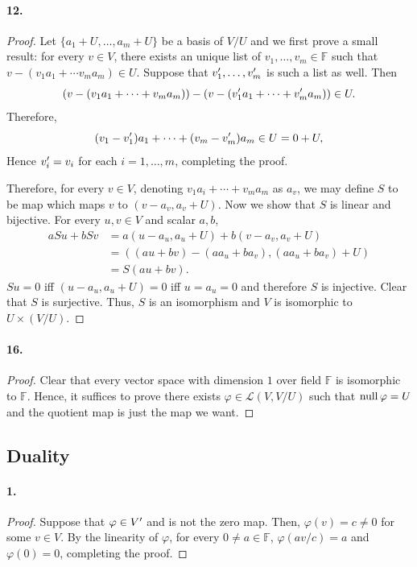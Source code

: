   \paragraph{12.}
  \begin{proof}
    Let $\{a_1+U,\dots, a_m+U\}$ be a basis of $V/U$ and we first prove a small
    result: for every $v\in V$, there exists an unique list of $v_1,\dots,v_m\in
    \mathbb{F}$ such that $v - (v_1a_1 + \cdots v_ma_m)\in U$. Suppose that 
    $v_1^\prime,\dots, v_m^\prime$ is such a list as well. Then 
    \[
      (v - (v_1a_1+\cdots+v_ma_m))-(v - (v_1^\prime a_1+\cdots+v_m^\prime a_m)) \in U.
    \]
    Therefore,
    \[
      (v_1-v_1^\prime)a_1+\cdots+(v_m-v_m^\prime)a_m \in U = 0+U,
    \]
    Hence $v_i^\prime = v_i$ for each $i=1,\dots,m$, completing the proof.\par
    Therefore, for every $v\in V$, denoting $v_1a_i+\cdots+v_ma_m$ as $a_v$, we 
    may define $S$ to be map which maps $v$ to $(v-a_v,a_v+U)$. Now we show that
    $S$ is linear and bijective. For every $u,v\in V$ and scalar $a, b$, 
    \begin{align*}
      aSu + bSv
      &= a(u-a_u,a_u+U) + b(v-a_v,a_v+U)  \\
      &= ((au+bv)-(aa_u+ba_v), (aa_u+ba_v) + U) \\
      &= S(au+bv).
    \end{align*}
    $Su = 0$ iff $(u-a_u,a_u+U) = 0$ iff $u=a_u=0$ and therefore $S$ is 
    injective. Clear that $S$ is surjective. Thus, $S$ is an isomorphism and 
    $V$ is isomorphic to $U\times(V/U)$.
  \end{proof}

  \paragraph{16.}
  \begin{proof}
    Clear that every vector space with dimension $1$ over field $\mathbb{F}$ is
    isomorphic to $\mathbb{F}$. Hence, it suffices to prove there exists 
    $\varphi\in\mathcal{L}(V,V/U)$ such that $\operatorname{null}\varphi = U$ and the quotient
    map is just the map we want.
  \end{proof}

\subsection{Duality}
  \paragraph{1.}
  \begin{proof}
    Suppose that $\varphi\in V^\prime$ and is not the zero map. Then, $\varphi(v)=c
    \ne 0$ for some $v\in V$. By the linearity of $\varphi$, for every $0\ne a
    \in\mathbb{F}$, $\varphi(av/c)=a$ and $\varphi(0)=0$, completing the proof.
  \end{proof}

